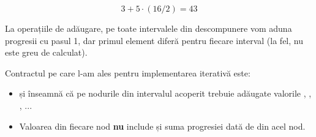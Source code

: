 $$3 + 5 \cdot (16/2) = 43$$

La operațiile de adăugare, pe toate intervalele din descompunere vom aduna progresii cu pasul 1, dar primul element diferă pentru fiecare interval (la fel, nu este greu de calculat).

Contractul pe care l-am ales pentru implementarea iterativă este:

\begin{itemize}
  \item {} și  înseamnă că pe nodurile din intervalul acoperit trebuie adăugate valorile , , , ...
  \item Valoarea  din fiecare nod \textbf{nu} include și suma progresiei dată de  din acel nod.
\end{itemize}
